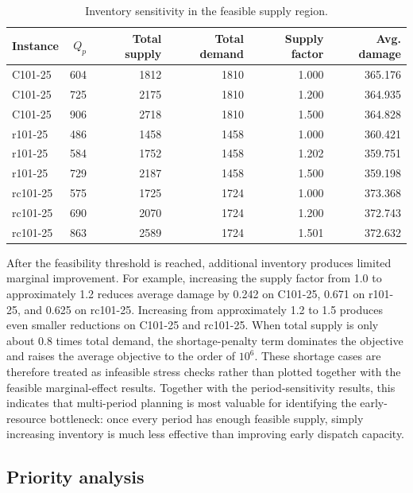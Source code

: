 ﻿\documentclass[preprint,12pt,authoryear]{elsarticle}
\begin{document}
\begin{table}[H]
\centering
\caption{Inventory sensitivity in the feasible supply region.}
\label{tab:inventory-sensitivity}
\small
\begin{tabular}{lrrrrr}
\toprule
Instance & $Q_p$ & Total supply & Total demand & Supply factor & Avg. damage \\
\midrule
C101-25 & 604 & 1812 & 1810 & 1.000 & 365.176 \\
C101-25 & 725 & 2175 & 1810 & 1.200 & 364.935 \\
C101-25 & 906 & 2718 & 1810 & 1.500 & 364.828 \\
\midrule
r101-25 & 486 & 1458 & 1458 & 1.000 & 360.421 \\
r101-25 & 584 & 1752 & 1458 & 1.202 & 359.751 \\
r101-25 & 729 & 2187 & 1458 & 1.500 & 359.198 \\
\midrule
rc101-25 & 575 & 1725 & 1724 & 1.000 & 373.368 \\
rc101-25 & 690 & 2070 & 1724 & 1.200 & 372.743 \\
rc101-25 & 863 & 2589 & 1724 & 1.501 & 372.632 \\
\bottomrule
\end{tabular}
\end{table}

After the feasibility threshold is reached, additional inventory produces limited marginal improvement. For example, increasing the supply factor from 1.0 to approximately 1.2 reduces average damage by 0.242 on C101-25, 0.671 on r101-25, and 0.625 on rc101-25. Increasing from approximately 1.2 to 1.5 produces even smaller reductions on C101-25 and rc101-25. When total supply is only about 0.8 times total demand, the shortage-penalty term dominates the objective and raises the average objective to the order of $10^6$. These shortage cases are therefore treated as infeasible stress checks rather than plotted together with the feasible marginal-effect results. Together with the period-sensitivity results, this indicates that multi-period planning is most valuable for identifying the early-resource bottleneck: once every period has enough feasible supply, simply increasing inventory is much less effective than improving early dispatch capacity.

\subsection{Priority analysis}
\label{subsec:priority-analysis}
\end{document}
